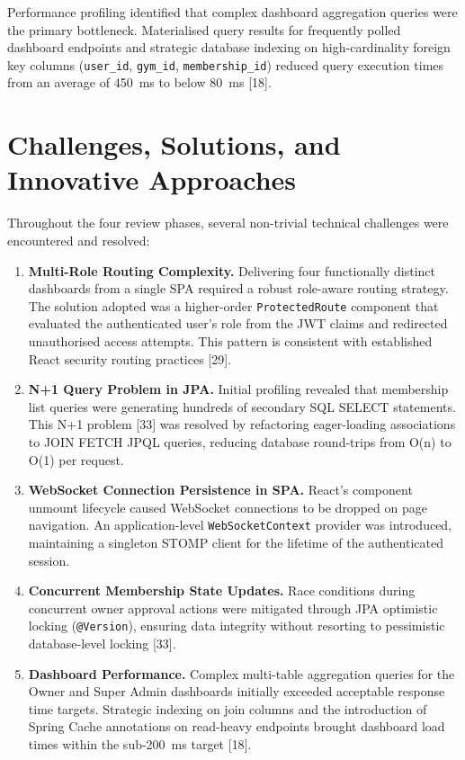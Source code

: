 \documentclass[
  12pt,
  a4paperpaper,
]{report}
\begin{document}
Performance profiling identified that complex dashboard aggregation
queries were the primary bottleneck. Materialised query results for
frequently polled dashboard endpoints and strategic database
indexing on high-cardinality foreign key columns (\texttt{user\_id},
\texttt{gym\_id}, \texttt{membership\_id}) reduced query execution
times from an average of 450~ms to below 80~ms {[}18{]}.

\section{Challenges, Solutions, and Innovative
Approaches}\label{challenges-solutions}

Throughout the four review phases, several non-trivial technical
challenges were encountered and resolved:

\begin{enumerate}
\def\labelenumi{\arabic{enumi}.}

\item \textbf{Multi-Role Routing Complexity.} Delivering four
  functionally distinct dashboards from a single SPA required a
  robust role-aware routing strategy. The solution adopted was a
  higher-order \texttt{ProtectedRoute} component that evaluated the
  authenticated user's role from the JWT claims and redirected
  unauthorised access attempts. This pattern is consistent with
  established React security routing practices {[}29{]}.

\item \textbf{N+1 Query Problem in JPA.} Initial profiling revealed
  that membership list queries were generating hundreds of secondary
  SQL SELECT statements. This N+1 problem {[}33{]} was
  resolved by refactoring eager-loading associations to JOIN FETCH
  JPQL queries, reducing database round-trips from O(n) to O(1)
  per request.

\item \textbf{WebSocket Connection Persistence in SPA.} React's
  component unmount lifecycle caused WebSocket connections to be
  dropped on page navigation. An application-level
  \texttt{WebSocketContext} provider was introduced, maintaining a
  singleton STOMP client for the lifetime of the authenticated
  session.

\item \textbf{Concurrent Membership State Updates.} Race conditions
  during concurrent owner approval actions were mitigated through
  JPA optimistic locking (\texttt{@Version}), ensuring data
  integrity without resorting to pessimistic database-level locking
  {[}33{]}.

\item \textbf{Dashboard Performance.} Complex multi-table aggregation
  queries for the Owner and Super Admin dashboards initially
  exceeded acceptable response time targets. Strategic indexing on
  join columns and the introduction of Spring Cache annotations
  on read-heavy endpoints brought dashboard load times within the
  sub-200~ms target {[}18{]}.

\end{enumerate}
\end{document}
